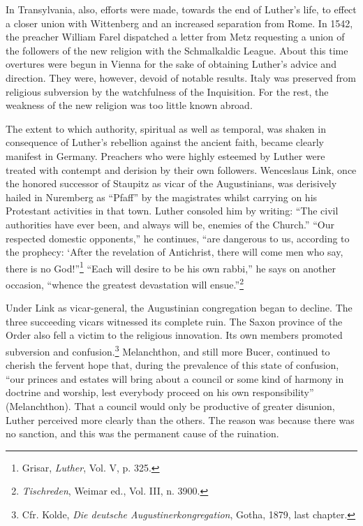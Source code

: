 In Transylvania, also, efforts were made, towards the end of Luther’s
life, to effect a closer union with Wittenberg and an increased
separation from Rome. In 1542, the preacher William Farel dispatched a
letter from Metz requesting a union of the followers of the
new religion with the Schmalkaldic League. About this time overtures
were begun in Vienna for the sake of obtaining Luther’s advice and
direction. They were, however, devoid of notable results. Italy was
preserved from religious subversion by the watchfulness of the Inquisition.
For the rest, the weakness of the new religion was too little
known abroad.

The extent to which authority, spiritual as well as temporal, was shaken in
consequence of Luther’s rebellion against the ancient faith, became clearly
manifest in Germany. Preachers who were highly esteemed by Luther were treated
with contempt and derision by their own followers. Wenceslaus Link, once the
honored successor of Staupitz as vicar of the Augustinians, was derisively
hailed in Nuremberg as “Pfaff” by the magistrates whilst carrying on his
Protestant activities in that town. Luther consoled him by writing: “The civil
authorities have ever been, and always will be, enemies of the Church.” “Our
respected domestic opponents,” he continues, “are dangerous to us, according to
the prophecy: ‘After the revelation of Antichrist, there will come men who say,
there is no God!”\footnote{Grisar, \textit{Luther}, Vol. V, p. 325.} “Each will
desire to be his own rabbi,” he says on another occasion, “whence the greatest
devastation will ensue.”\footnote{\textit{Tischreden}, Weimar ed., Vol. III, n.
3900.}

Under Link as vicar-general, the Augustinian congregation began
to decline. The three succeeding vicars witnessed its complete
ruin. The Saxon province of the Order also fell a victim to the religious
innovation. Its own members promoted subversion and confusion.\footnote{Cfr. Kolde, \textit{Die deutsche Augustinerkongregation}, Gotha, 1879, last chapter.}
Melanchthon, and still more Bucer, continued to cherish the
fervent hope that, during the prevalence of this state of confusion,
“our princes and estates will bring about a council or some kind of
harmony in doctrine and worship, lest everybody proceed on his own
responsibility” (Melanchthon). That a council would only be productive
of greater disunion, Luther perceived more clearly than the
others. The reason was because there was no sanction, and this was
the permanent cause of the ruination.

